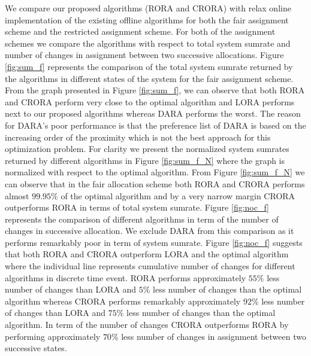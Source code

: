 \documentclass[times]{dacauth}
\begin{document}




\smallskip
\noindent
We compare our proposed algorithms (RORA and CRORA) with relax online implementation of the existing offline algorithms for both the fair assignment scheme and the restricted assignment scheme. For both of the assignment schemes we compare the algorithms with respect to total system sumrate and number of changes in assignment between two successive allocations. Figure \ref{fig:sum_f} represents the comparison of the total system sumrate returned by the algorithms in different states of the system for the fair assignment scheme. From the graph presented in Figure \ref{fig:sum_f}, we can observe that both RORA and CRORA perform very close to the optimal algorithm and LORA performs next to our proposed algorithms whereas DARA performs the worst. The reason for DARA's poor performance is that the preference list of DARA is based on the increasing order of the proximity which is not the best approach for this optimization problem. For clarity we present the normalized system sumrates returned by different algorithms in Figure \ref{fig:sum_f_N} where the graph is normalized with respect to the optimal algorithm. From Figure \ref{fig:sum_f_N} we can observe that in the fair allocation scheme both RORA and CRORA performs almost $99.95\%$ of the optimal algorithm and by a very narrow margin CRORA outperforms RORA  in terms of total system sumrate. Figure  \ref{fig:noc_f} represents the comparison of different algorithms in term of the number of changes in successive allocation. We exclude DARA from this comparison as it performs remarkably poor in term of system sumrate. Figure \ref{fig:noc_f} suggests that both RORA and CRORA outperform LORA and the optimal algorithm where the individual line represents cumulative number of changes for different algorithms in discrete time event. RORA performs approximately $55\%$ less number of changes than LORA and $5\%$ less number of changes than the optimal algorithm whereas CRORA performs remarkably approximately $92\%$ less number of changes than LORA and $75\%$ less number of changes than the optimal algorithm. In term of the number of changes CRORA outperforms RORA by performing approximately $70\%$ less number of changes in assignment between two successive states. 
\end{document}
